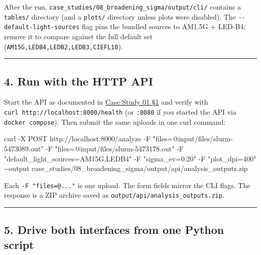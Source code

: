 \documentclass[
  11pt,
]{article}
\newenvironment{Shaded}{}{}
\newcommand{\AttributeTok}[1]{\textcolor[rgb]{0.49,0.56,0.16}{#1}}
\newcommand{\ExtensionTok}[1]{#1}
\newcommand{\NormalTok}[1]{#1}
\newcommand{\StringTok}[1]{\textcolor[rgb]{0.25,0.44,0.63}{#1}}
\begin{document}
After the run, \texttt{case\_studies/08\_broadening\_sigma/output/cli/}
contains a \texttt{tables/} directory (and a \texttt{plots/} directory
unless plots were disabled). The \texttt{-\/-default-light-sources} flag
pins the bundled sources to AM1.5G + LED-B4; remove it to compare
against the full default set (\texttt{AM15G,LEDB4,LEDB2,LEDB3,CIEFL10}).

\begin{center}\rule{0.5\linewidth}{0.5pt}\end{center}

\hypertarget{4-run-with-the-http-api}{
\subsection{4. Run with the HTTP API}\label{4-run-with-the-http-api}}

Start the API as documented in
\href{https://github.com/pinarsyt/overlap-calculator/blob/main/case_studies/01_theoretical_only/README.md\#1-prerequisites}{Case
Study 01 §1} and verify with
\texttt{curl\ http://localhost:8000/health} (or \texttt{:8080} if you
started the API via \texttt{docker\ compose}). Then submit the same
uploads in one curl command:

\begin{Shaded}
\begin{Highlighting}[]
\ExtensionTok{curl} \AttributeTok{{-}X}\NormalTok{ POST http://localhost:8000/analyze }\AttributeTok{{-}F} \StringTok{"files=@input/files/slurm{-}5473089.out"} \AttributeTok{{-}F} \StringTok{"files=@input/files/slurm{-}5473178.out"} \AttributeTok{{-}F} \StringTok{"default\_light\_sources=AM15G,LEDB4"} \AttributeTok{{-}F} \StringTok{"sigma\_ev=0.20"} \AttributeTok{{-}F} \StringTok{"plot\_dpi=400"} \AttributeTok{{-}{-}output}\NormalTok{ case\_studies/08\_broadening\_sigma/output/api/analysis\_outputs.zip}
\end{Highlighting}
\end{Shaded}

Each \texttt{-F\ "files=@..."} is one upload. The form fields mirror the
CLI flags. The response is a ZIP archive saved as
\texttt{output/api/analysis\_outputs.zip}.

\begin{center}\rule{0.5\linewidth}{0.5pt}\end{center}

\hypertarget{5-drive-both-interfaces-from-one-python-script}{
\subsection{5. Drive both interfaces from one Python
script}\label{5-drive-both-interfaces-from-one-python-script}}
\end{document}
